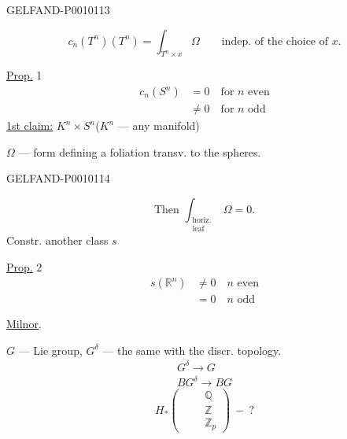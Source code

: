 \begin{GelfandAdjacentEvidence}{GELFAND-P001011}{3}

\[
c_n(T^n)(T^n)=\int_{T^n\times x}\Omega
\qquad\text{indep. of the choice of }x.
\]

\underline{Prop.} 1
\[
\begin{aligned}
c_n(S^n)&=0\quad\text{for }n\text{ even}\\
&\ne0\quad\text{for }n\text{ odd}
\end{aligned}
\]
\underline{1st claim:}
$K^n\times S^n$\qquad ($K^n$ --- any manifold)

$\Omega$ --- form defining a foliation transv. to the spheres.
\end{GelfandAdjacentEvidence}
\begin{GelfandAdjacentEvidence}{GELFAND-P001011}{4}

\[
\text{Then }\int_{\substack{\text{horiz.}\\\text{leaf}}}\Omega=0.
\]
Constr. another class $s$

\underline{Prop.} 2
\[
\begin{aligned}
s(\mathbb R^n)&\ne0\quad n\text{ even}\\
&=0\quad n\text{ odd}
\end{aligned}
\]

\underline{\underline{Milnor}}.

$G$ --- Lie group, $G^\delta$ --- the same with the discr. topology.
\[
\begin{gathered}
G^\delta\longrightarrow G\\
BG^\delta\longrightarrow BG
\end{gathered}
\]
\[
H_*\left(\qquad\begin{matrix}\mathbb Q\\\mathbb Z\\\mathbb Z_p\end{matrix}\right)\ -\ ?
\]
\end{GelfandAdjacentEvidence}



